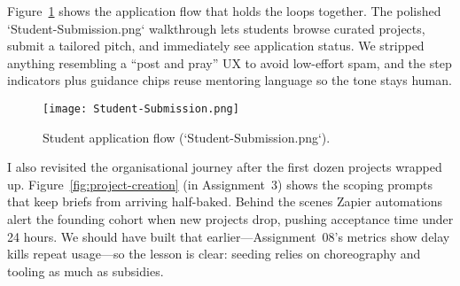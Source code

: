Figure~\ref{fig:application-flow} shows the application flow that holds the loops together. The polished `Student-Submission.png` walkthrough lets students browse curated projects, submit a tailored pitch, and immediately see application status. We stripped anything resembling a ``post and pray'' UX to avoid low-effort spam, and the step indicators plus guidance chips reuse mentoring language so the tone stays human.

\begin{figure}[H]
  \centering
  \texttt{[image: Student-Submission.png]}
  \caption{Student application flow (`Student-Submission.png`).}
  \label{fig:application-flow}
\end{figure}

I also revisited the organisational journey after the first dozen projects wrapped up. Figure~\ref{fig:project-creation} (in Assignment~3) shows the scoping prompts that keep briefs from arriving half-baked. Behind the scenes Zapier automations alert the founding cohort when new projects drop, pushing acceptance time under 24 hours. We should have built that earlier---Assignment~08's metrics show delay kills repeat usage---so the lesson is clear: seeding relies on choreography and tooling as much as subsidies.
